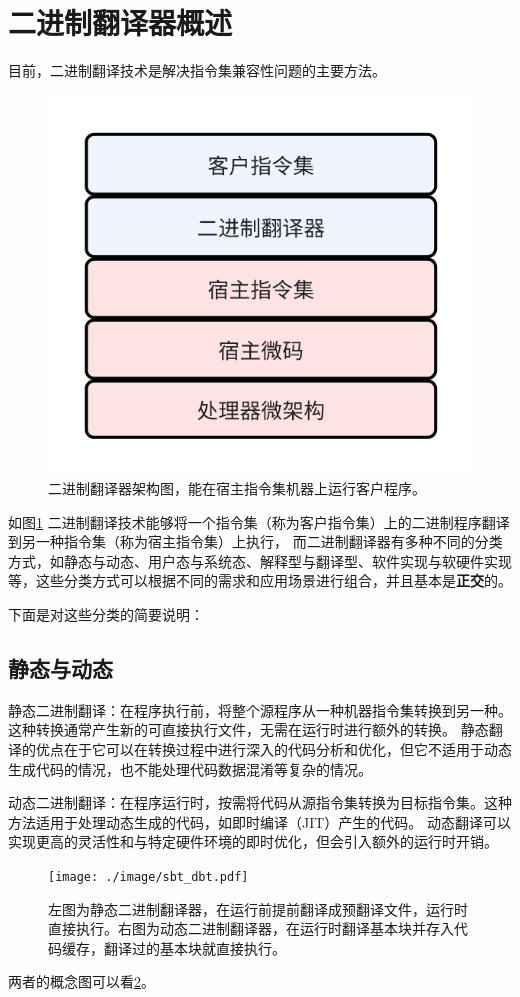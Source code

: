 \section{二进制翻译器概述}
目前，二进制翻译技术是解决指令集兼容性问题的主要方法。

\begin{figure}[h]
  \centering
  \includegraphics[width=0.3\linewidth]{./feishuImage/BT_arch.png}
  \caption{二进制翻译器架构图，能在宿主指令集机器上运行客户程序。}
  \label{img:BT_arch}
\end{figure}

如图\ref{img:BT_arch} 二进制翻译技术能够将一个指令集（称为客户指令集）上的二进制程序翻译到另一种指令集（称为宿主指令集）上执行，
而二进制翻译器有多种不同的分类方式，如静态与动态、用户态与系统态、解释型与翻译型、软件实现与软硬件实现等，这些分类方式可以根据不同的需求和应用场景进行组合，并且基本是\textbf{正交}的。

下面是对这些分类的简要说明：

\subsection{静态与动态}
静态二进制翻译：在程序执行前，将整个源程序从一种机器指令集转换到另一种。这种转换通常产生新的可直接执行文件，无需在运行时进行额外的转换。
静态翻译的优点在于它可以在转换过程中进行深入的代码分析和优化，但它不适用于动态生成代码的情况，也不能处理代码数据混淆等复杂的情况。

动态二进制翻译：在程序运行时，按需将代码从源指令集转换为目标指令集。这种方法适用于处理动态生成的代码，如即时编译（JIT）产生的代码。
动态翻译可以实现更高的灵活性和与特定硬件环境的即时优化，但会引入额外的运行时开销。

\begin{figure}[h]
  \centering
  \texttt{[image: ./image/sbt\_dbt.pdf]}
  \caption{左图为静态二进制翻译器，在运行前提前翻译成预翻译文件，运行时直接执行。右图为动态二进制翻译器，在运行时翻译基本块并存入代码缓存，翻译过的基本块就直接执行。}
  \label{img:sbt_dbt}
\end{figure}

两者的概念图可以看\ref{img:sbt_dbt}。

